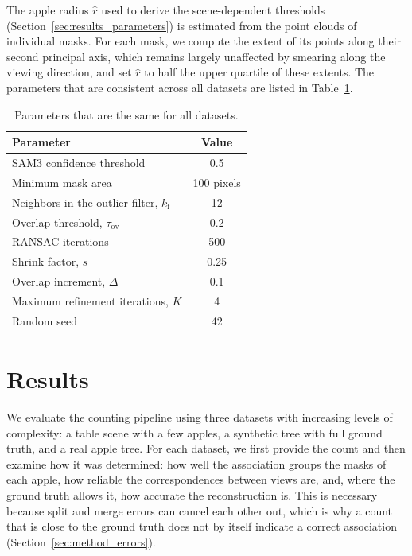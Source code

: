 \documentclass[english, egger, bsc]{vcethesis}
\begin{document}
The apple radius $\hat{r}$ used to derive the scene-dependent thresholds (Section~\ref{sec:results_parameters}) is estimated from the point clouds of individual masks. For each mask, we compute the extent of its points along their second principal axis, which remains largely unaffected by smearing along the viewing direction, and set $\hat{r}$ to half the upper quartile of these extents. The parameters that are consistent across all datasets are listed in Table~\ref{tab:method_fixed_params}.
\begin{table}[tbp]
    \centering
    \caption{Parameters that are the same for all datasets.}
    \label{tab:method_fixed_params}
    \small
    \begin{tabular}{lc}
        \toprule
        Parameter & Value \\
        \midrule
        SAM3 confidence threshold                  & 0.5 \\
        Minimum mask area                          & 100 pixels \\
        Neighbors in the outlier filter, $k_{\mathrm{f}}$ & 12 \\
        Overlap threshold, $\tau_{\mathrm{ov}}$    & 0.2 \\
        RANSAC iterations                          & 500 \\
        Shrink factor, $s$                         & 0.25 \\
        Overlap increment, $\Delta$                & 0.1 \\
        Maximum refinement iterations, $K$         & 4 \\
        Random seed                                & 42 \\
        \bottomrule
    \end{tabular}
\end{table}


\chapter{Results}
\label{chap:results}
We evaluate the counting pipeline using three datasets with increasing levels of complexity: a table scene with a few apples, a synthetic tree with full ground truth, and a real apple tree. For each dataset, we first provide the count and then examine how it was determined: how well the association groups the masks of each apple, how reliable the correspondences between views are, and, where the ground truth allows it, how accurate the reconstruction is. This is necessary because split and merge errors can cancel each other out, which is why a count that is close to the ground truth does not by itself indicate a correct association (Section~\ref{sec:method_errors}).
\end{document}
